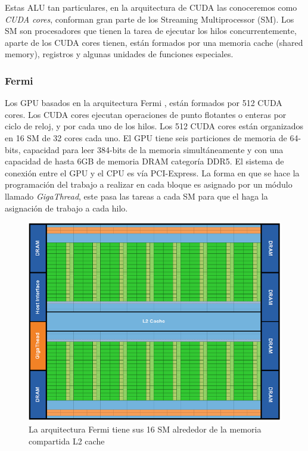 Estas ALU tan particulares, en la arquitectura de CUDA las conoceremos como \textit{CUDA cores}, conforman gran parte de los Streaming Multiprocessor (SM). Los SM son procesadores que tienen la tarea de ejecutar los hilos concurrentemente, aparte de los CUDA cores tienen, están formados por una memoria cache (shared memory), registros y algunas unidades de funciones especiales.

\subsubsection{Fermi}

Los GPU basados en la arquitectura Fermi \cite{fermi}, están formados por 512 CUDA cores. Los CUDA cores ejecutan operaciones de punto flotantes o enteras por ciclo de reloj, y por cada uno de los hilos. Los 512 CUDA cores están organizados en 16 SM de 32 cores cada uno. El GPU tiene seis particiones de memoria de 64-bits, capacidad para leer 384-bits de la memoria simultáneamente y con una capacidad de hasta 6GB de memoria DRAM categoría DDR5. El sistema de conexión entre el GPU y el CPU es vía PCI-Express. La forma en que se hace la programación del trabajo a realizar en cada bloque es asignado por un módulo llamado \textit{GigaThread}, este pasa las tareas a cada SM para que el haga la asignación de trabajo a cada hilo. 

\begin{figure}[ph]
			\centering
				\includegraphics[scale=0.7]{img/ArqFermi.png}
			\caption{La arquitectura Fermi tiene sus 16 SM alrededor de la memoria compartida L2 cache \cite{fermi}}
\end{figure}

